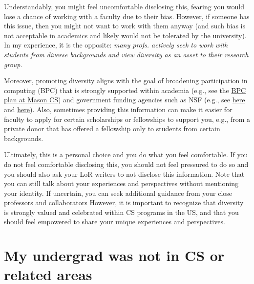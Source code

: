 \documentclass[oneside,11pt,dvipsnames]{book}
\begin{document}
Understandably, you might feel uncomfortable disclosing this, fearing you would lose a chance of working with a faculty due to their bias.  However, if someone has this issue, then you might not want to work with them anyway (and such bias is not acceptable in academics and likely would not be tolerated by the university). In my experience, it is the opposite: \emph{many profs. actively seek to work with students from diverse backgrounds and view diversity as an asset to their research group}.

Moreover, promoting diversity aligns with the goal of broadening participation in computing (BPC) that is strongly supported within academia (e.g., see the \href{https://plans.bpcnet.org/GeorgeMasonUniversity_ComputerScience_DepartmentalBPCPlan.pdf}{BPC plan at Mason CS}) and government funding agencies such as NSF (e.g., see \href{https://new.nsf.gov/cise/broadening-participation}{here} and \href{https://www.nsf.gov/pubs/2022/nsf22125/nsf22125.jsp}{here}).
Also, sometimes providing this information can make it easier for faculty to apply for certain scholarships or fellowships to support you, e.g., from a private donor that has offered a fellowship only to students from certain backgrounds.

Ultimately, this is a personal choice and you do what you feel comfortable.
If you do not feel comfortable disclosing this, you should not feel pressured to do so and you should also ask your LoR writers to not disclose this information.
Note that you can still talk about your experiences and perspectives without mentioning your identity.
If uncertain, you can seek additional guidance from your close professors and collaborators However, it is important to recognize that diversity is strongly valued and celebrated within CS programs in the US, and that you should feel empowered to share your unique experiences and perspectives.





\section{My undergrad was not in CS or related areas}\label{sec:non-stem}
\end{document}
